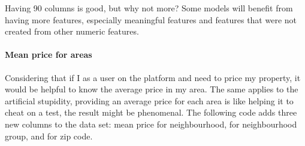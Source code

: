 \documentclass[
]{article}
\begin{document}
Having 90 columns is good, but why not more? Some models will benefit
from having more features, especially meaningful features and features
that were not created from other numeric features.

\hypertarget{mean-price-for-areas}{%
\paragraph{Mean price for areas}\label{mean-price-for-areas}}

Considering that if I as a user on the platform and need to price my
property, it would be helpful to know the average price in my area. The
same applies to the artificial stupidity, providing an average price for
each area is like helping it to cheat on a test, the result might be
phenomenal. The following code adds three new columns to the data set:
mean price for neighbourhood, for neighbourhood group, and for zip code.
\end{document}
